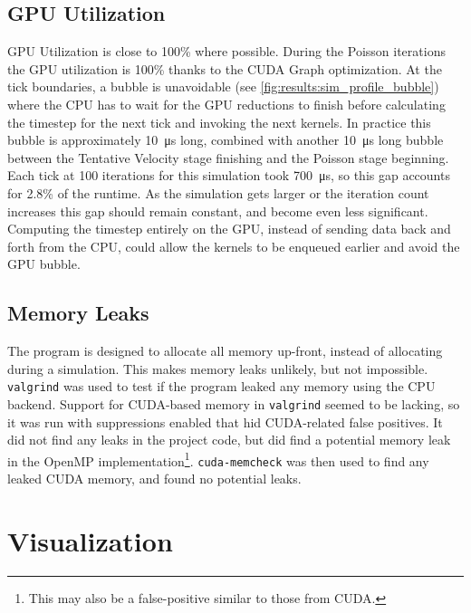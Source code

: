 \subsection{GPU Utilization}\label{sec:Results:Sim:Efficiency}

GPU Utilization is close to 100\% where possible.
During the Poisson iterations the GPU utilization is 100\% thanks to the CUDA Graph optimization.
At the tick boundaries, a bubble is unavoidable (see \cref{fig:results:sim_profile_bubble}) where the CPU has to wait for the GPU reductions to finish before calculating the timestep for the next tick and invoking the next kernels.
In practice this bubble is approximately \SI{10}{\micro\second} long, combined with another \SI{10}{\micro\second} long bubble between the Tentative Velocity stage finishing and the Poisson stage beginning.
Each tick at 100 iterations for this simulation took \SI{700}{\micro\second}, so this gap accounts for 2.8\% of the runtime.
As the simulation gets larger or the iteration count increases this gap should remain constant, and become even less significant.
Computing the timestep entirely on the GPU, instead of sending data back and forth from the CPU, could allow the kernels to be enqueued earlier and avoid the GPU bubble.

\subsection{Memory Leaks}\label{sec:Results:Sim:Mem}
The program is designed to allocate all memory up-front, instead of allocating during a simulation.
This makes memory leaks unlikely, but not impossible.
\texttt{valgrind} was used to test if the program leaked any memory using the CPU backend.
Support for CUDA-based memory in \texttt{valgrind} seemed to be lacking, so it was run with suppressions enabled that hid CUDA-related false positives.
It did not find any leaks in the project code, but did find a potential memory leak in the OpenMP implementation\footnote{This may also be a false-positive similar to those from CUDA.}.
\texttt{cuda-memcheck} was then used to find any leaked CUDA memory, and found no potential leaks.

\section{Visualization}
